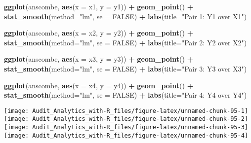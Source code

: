 \documentclass[
]{book}
\newenvironment{Shaded}{\begin{snugshade}}{\end{snugshade}}
\newcommand{\DataTypeTok}[1]{\textcolor[rgb]{0.13,0.29,0.53}{#1}}
\newcommand{\KeywordTok}[1]{\textcolor[rgb]{0.13,0.29,0.53}{\textbf{#1}}}
\newcommand{\NormalTok}[1]{#1}
\newcommand{\OperatorTok}[1]{\textcolor[rgb]{0.81,0.36,0.00}{\textbf{#1}}}
\newcommand{\OtherTok}[1]{\textcolor[rgb]{0.56,0.35,0.01}{#1}}
\newcommand{\StringTok}[1]{\textcolor[rgb]{0.31,0.60,0.02}{#1}}
\begin{document}
\begin{Shaded}
\begin{Highlighting}[]
\KeywordTok{ggplot}\NormalTok{(anscombe, }\KeywordTok{aes}\NormalTok{(}\DataTypeTok{x =}\NormalTok{ x1, }\DataTypeTok{y =}\NormalTok{ y1)) }\OperatorTok{+}\StringTok{ }
\StringTok{  }\KeywordTok{geom_point}\NormalTok{() }\OperatorTok{+}\StringTok{ }
\StringTok{  }\KeywordTok{stat_smooth}\NormalTok{(}\DataTypeTok{method=}\StringTok{"lm"}\NormalTok{, }\DataTypeTok{se =} \OtherTok{FALSE}\NormalTok{) }\OperatorTok{+}
\StringTok{  }\KeywordTok{labs}\NormalTok{(}\DataTypeTok{title=}\StringTok{"Pair 1: Y1 over X1"}\NormalTok{)}

\KeywordTok{ggplot}\NormalTok{(anscombe, }\KeywordTok{aes}\NormalTok{(}\DataTypeTok{x =}\NormalTok{ x2, }\DataTypeTok{y =}\NormalTok{ y2)) }\OperatorTok{+}\StringTok{ }
\StringTok{  }\KeywordTok{geom_point}\NormalTok{() }\OperatorTok{+}\StringTok{ }
\StringTok{  }\KeywordTok{stat_smooth}\NormalTok{(}\DataTypeTok{method=}\StringTok{"lm"}\NormalTok{, }\DataTypeTok{se =} \OtherTok{FALSE}\NormalTok{) }\OperatorTok{+}
\StringTok{  }\KeywordTok{labs}\NormalTok{(}\DataTypeTok{title=}\StringTok{"Pair 2: Y2 over X2"}\NormalTok{)}

\KeywordTok{ggplot}\NormalTok{(anscombe, }\KeywordTok{aes}\NormalTok{(}\DataTypeTok{x =}\NormalTok{ x3, }\DataTypeTok{y =}\NormalTok{ y3)) }\OperatorTok{+}\StringTok{ }
\StringTok{  }\KeywordTok{geom_point}\NormalTok{() }\OperatorTok{+}\StringTok{ }
\StringTok{  }\KeywordTok{stat_smooth}\NormalTok{(}\DataTypeTok{method=}\StringTok{"lm"}\NormalTok{, }\DataTypeTok{se =} \OtherTok{FALSE}\NormalTok{) }\OperatorTok{+}
\StringTok{  }\KeywordTok{labs}\NormalTok{(}\DataTypeTok{title=}\StringTok{"Pair 3: Y3 over X3"}\NormalTok{)}

\KeywordTok{ggplot}\NormalTok{(anscombe, }\KeywordTok{aes}\NormalTok{(}\DataTypeTok{x =}\NormalTok{ x4, }\DataTypeTok{y =}\NormalTok{ y4)) }\OperatorTok{+}\StringTok{ }
\StringTok{  }\KeywordTok{geom_point}\NormalTok{() }\OperatorTok{+}\StringTok{ }
\StringTok{  }\KeywordTok{stat_smooth}\NormalTok{(}\DataTypeTok{method=}\StringTok{"lm"}\NormalTok{, }\DataTypeTok{se =} \OtherTok{FALSE}\NormalTok{) }\OperatorTok{+}
\StringTok{  }\KeywordTok{labs}\NormalTok{(}\DataTypeTok{title=}\StringTok{"Pair 4: Y4 over Y4"}\NormalTok{)}
\end{Highlighting}
\end{Shaded}

\texttt{[image: Audit\_Analytics\_with-R\_files/figure-latex/unnamed-chunk-95-1]} \texttt{[image: Audit\_Analytics\_with-R\_files/figure-latex/unnamed-chunk-95-2]} \texttt{[image: Audit\_Analytics\_with-R\_files/figure-latex/unnamed-chunk-95-3]} \texttt{[image: Audit\_Analytics\_with-R\_files/figure-latex/unnamed-chunk-95-4]}
\end{document}

